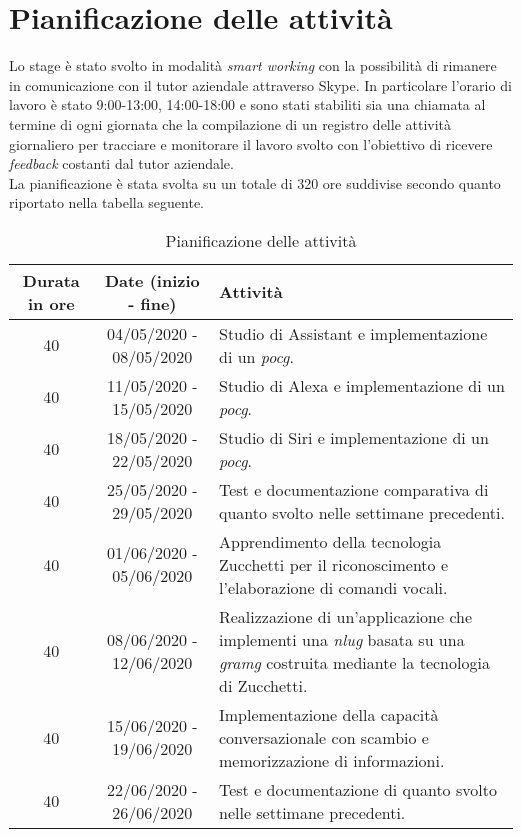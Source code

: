 \section{Pianificazione delle attività}
Lo stage è stato svolto in modalità \emph{smart working} con la possibilità di rimanere in comunicazione con il tutor aziendale attraverso Skype. In particolare l'orario di lavoro è stato 9:00-13:00, 14:00-18:00 e sono stati stabiliti sia una chiamata al termine di ogni giornata che la compilazione di un registro delle attività giornaliero per tracciare e monitorare il lavoro svolto con l'obiettivo di ricevere \emph{feedback} costanti dal tutor aziendale. \\
La pianificazione è stata svolta su un totale di 320 ore suddivise secondo quanto riportato nella tabella seguente.
\pagebreak
\begin{table}
	\begin{tabularx}{\textwidth}{|c|c|X|}
		\hline
		\textbf{Durata in ore} & \textbf{Date (inizio - fine)} & \textbf{Attività} \\\hline
		
		40 & 04/05/2020 - 08/05/2020 & Studio di Assistant e implementazione di un \emph{\gls{pocg}}. \\
		\hline
		40 & 11/05/2020 - 15/05/2020 & Studio di Alexa e implementazione di un \emph{\gls{pocg}}. \\
		\hline
		40 & 18/05/2020 - 22/05/2020 & Studio di Siri e implementazione di un \emph{\gls{pocg}}. \\
		\hline
		40 & 25/05/2020 - 29/05/2020 & Test e documentazione comparativa di quanto svolto nelle settimane precedenti. \\
		\hline
		40 & 01/06/2020 - 05/06/2020 & Apprendimento della tecnologia Zucchetti per il riconoscimento e l'elaborazione di comandi vocali. \\
		\hline
		40 & 08/06/2020 - 12/06/2020 & Realizzazione di un'applicazione che implementi una \emph{\gls{nlug}} basata su una \emph{\gls{gramg}} costruita mediante la tecnologia di Zucchetti. \\
		\hline
		40 & 15/06/2020 - 19/06/2020 & Implementazione della capacità conversazionale con scambio e memorizzazione di informazioni. \\
		\hline
		40 & 22/06/2020 - 26/06/2020 & Test e documentazione di quanto svolto nelle settimane precedenti. \\	
		\hline
	\end{tabularx}
	\caption{Pianificazione delle attività}
\end{table}

